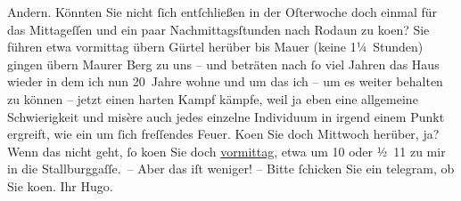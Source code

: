 \begin{ledgroupsized}[t]{13cm}
               Andern.\pend
           \pstart
           Könnten Sie nicht ſich entſchließen in der Oſterwoche doch einmal für
               das Mittageſſen und ein paar Nachmittagsſtunden nach Rodaun zu ko{\geminationm}en? {\pb}Sie führen etwa vormittag übern
                  Gürtel herüber bis Mauer (keine 1¼ Stunden) gingen übern Maurer
                  Berg zu uns – und beträten nach ſo viel Jahren das Haus wieder in dem ich nun 20 Jahre wohne und
               um das ich – um es weiter behalten zu können – jetzt einen harten Kampf kämpfe, weil
               ja eben eine {\pb}allgemeine
               Schwierigkeit und misère auch jedes einzelne Individuum in irgend einem Punkt
               ergreift, wie ein um ſich freſſendes Feuer.\pend
           \pstart
           Ko{\geminationm}en Sie doch Mittwoch herüber, ja?\pend
           \pstart
           Wenn das nicht geht, ſo ko{\geminationm}en Sie doch \label{K_L02364_1v}\label{K_L02364_1h}{ }\uline{vormittag}, etwa um 10 oder ½ 11 zu mir in die Stallburggaſſe. – Aber das iſt weniger! – Bitte
               ſchicken Sie ein telegram, ob Sie ko{\geminationm}en.\pend
           \pstart Ihr \spacefill\mbox{Hugo.}\pend{}
         
         \endnumbering{}\end{ledgroupsized}  \newcommand{\dateiname}{L02364}\newcommand{\titel}{Hugo Hofmannsthal an Arthur Schnitzler, [19. 3. 1921]}\newcommand{\editorInnen}{Martin Anton Müller und Gerd-Hermann Susen}
      
